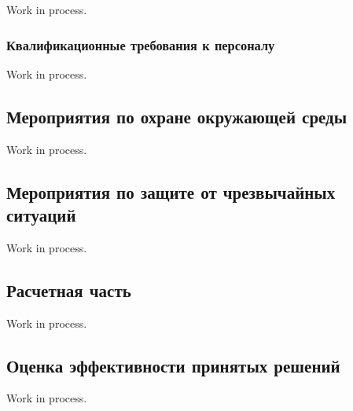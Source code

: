 Work in process.

\subsubsection{Квалификационные требования к персоналу}

Work in process.

\subsection{Мероприятия по охране окружающей среды}

Work in process.

\subsection{Мероприятия по защите от чрезвычайных ситуаций}

Work in process.

\subsection{Расчетная часть}

Work in process.

\subsection{Оценка эффективности принятых решений}

Work in process.

\clearpage
\newpage